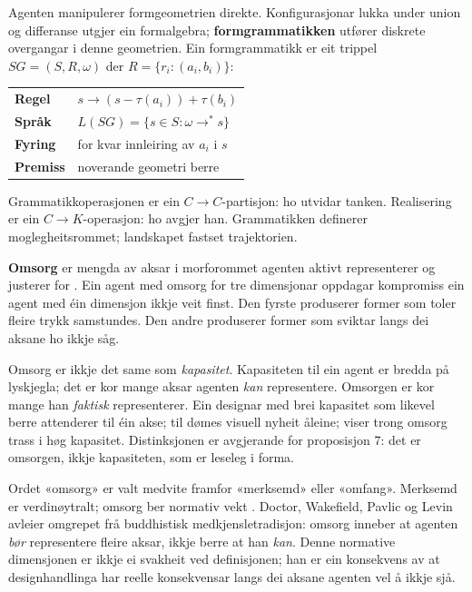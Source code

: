 Agenten manipulerer formgeometrien direkte. Konfigurasjonar lukka under union og differanse utgjer ein formalgebra; \textbf{formgrammatikken} \parencite{Stiny1972} utfører diskrete overgangar i denne geometrien. Ein formgrammatikk er eit trippel $SG = (S, R, \omega)$ der $R = \{r_i : (a_i, b_i)\}$:

\begin{center}\small
\begin{tabular}{@{}l@{\;\;}l@{}}
\textbf{Regel} & $s \!\to\! (s - \tau(a_i)) + \tau(b_i)$ \\[2pt]
\textbf{Språk} & $L(SG) = \{s \!\in\! S : \omega \!\to^*\! s\}$ \\[2pt]
\textbf{Fyring} & for kvar innleiring av $a_i$ i $s$ \\
\textbf{Premiss} & noverande geometri berre \\
\end{tabular}
\end{center}

\noindent Grammatikkoperasjonen er ein $C \to C$-partisjon: ho utvidar tanken. Realisering er ein $C \to K$-operasjon: ho avgjer han. Grammatikken definerer moglegheitsrommet; landskapet fastset trajektorien.

\textbf{Omsorg} er mengda av aksar i morforommet agenten aktivt representerer og justerer for \parencite{Doctor2024}. Ein agent med omsorg for tre dimensjonar oppdagar kompromiss ein agent med éin dimensjon ikkje veit finst. Den fyrste produserer former som toler fleire trykk samstundes. Den andre produserer former som sviktar langs dei aksane ho ikkje såg.

Omsorg er ikkje det same som \textit{kapasitet}. Kapasiteten til ein agent er bredda på lyskjegla; det er kor mange aksar agenten \textit{kan} representere. Omsorgen er kor mange han \textit{faktisk} representerer. Ein designar med brei kapasitet som likevel berre attenderer til éin akse; til dømes visuell nyheit åleine; viser trong omsorg trass i høg kapasitet. Distinksjonen er avgjerande for proposisjon 7: det er omsorgen, ikkje kapasiteten, som er leseleg i forma.

Ordet «omsorg» er valt medvite framfor «merksemd» eller «omfang». Merksemd er verdinøytralt; omsorg ber normativ vekt \parencite{Doctor2024}. Doctor, Wakefield, Pavlic og Levin avleier omgrepet frå buddhistisk medkjensletradisjon: omsorg inneber at agenten \textit{bør} representere fleire aksar, ikkje berre at han \textit{kan}. Denne normative dimensjonen er ikkje ei svakheit ved definisjonen; han er ein konsekvens av at designhandlinga har reelle konsekvensar langs dei aksane agenten vel å ikkje sjå.

